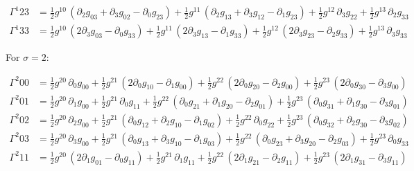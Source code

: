 \documentclass[
]{article}
\begin{document}
\[\begin{aligned}
\Gamma^{1}_{}{23} &= \tfrac{1}{2} g^{10}\, \left( \partial_{2} g_{03} + \partial_{3} g_{02} - \partial_{0} g_{23} \right) + \tfrac{1}{2} g^{11}\, \left( \partial_{2} g_{13} + \partial_{3} g_{12} - \partial_{1} g_{23} \right) + \tfrac{1}{2} g^{12}\, \partial_{3} g_{22} + \tfrac{1}{2} g^{13}\, \partial_{2} g_{33} \\
\Gamma^{1}_{}{33} &= \tfrac{1}{2} g^{10}\, \left( 2 \partial_{3} g_{03} - \partial_{0} g_{33} \right) + \tfrac{1}{2} g^{11}\, \left( 2 \partial_{3} g_{13} - \partial_{1} g_{33} \right) + \tfrac{1}{2} g^{12}\, \left( 2 \partial_{3} g_{23} - \partial_{2} g_{33} \right) + \tfrac{1}{2} g^{13}\, \partial_{3} g_{33}
\end{aligned}\]

For \(\sigma = 2\):

\[\begin{aligned}
\Gamma^{2}_{}{00} &= \tfrac{1}{2} g^{20}\, \partial_{0} g_{00} + \tfrac{1}{2} g^{21}\, \left( 2 \partial_{0} g_{10} - \partial_{1} g_{00} \right) + \tfrac{1}{2} g^{22}\, \left( 2 \partial_{0} g_{20} - \partial_{2} g_{00} \right) + \tfrac{1}{2} g^{23}\, \left( 2 \partial_{0} g_{30} - \partial_{3} g_{00} \right) \\
\Gamma^{2}_{}{01} &= \tfrac{1}{2} g^{20}\, \partial_{1} g_{00} + \tfrac{1}{2} g^{21}\, \partial_{0} g_{11} + \tfrac{1}{2} g^{22}\, \left( \partial_{0} g_{21} + \partial_{1} g_{20} - \partial_{2} g_{01} \right) + \tfrac{1}{2} g^{23}\, \left( \partial_{0} g_{31} + \partial_{1} g_{30} - \partial_{3} g_{01} \right) \\
\Gamma^{2}_{}{02} &= \tfrac{1}{2} g^{20}\, \partial_{2} g_{00} + \tfrac{1}{2} g^{21}\, \left( \partial_{0} g_{12} + \partial_{2} g_{10} - \partial_{1} g_{02} \right) + \tfrac{1}{2} g^{22}\, \partial_{0} g_{22} + \tfrac{1}{2} g^{23}\, \left( \partial_{0} g_{32} + \partial_{2} g_{30} - \partial_{3} g_{02} \right) \\
\Gamma^{2}_{}{03} &= \tfrac{1}{2} g^{20}\, \partial_{3} g_{00} + \tfrac{1}{2} g^{21}\, \left( \partial_{0} g_{13} + \partial_{3} g_{10} - \partial_{1} g_{03} \right) + \tfrac{1}{2} g^{22}\, \left( \partial_{0} g_{23} + \partial_{3} g_{20} - \partial_{2} g_{03} \right) + \tfrac{1}{2} g^{23}\, \partial_{0} g_{33} \\
\Gamma^{2}_{}{11} &= \tfrac{1}{2} g^{20}\, \left( 2 \partial_{1} g_{01} - \partial_{0} g_{11} \right) + \tfrac{1}{2} g^{21}\, \partial_{1} g_{11} + \tfrac{1}{2} g^{22}\, \left( 2 \partial_{1} g_{21} - \partial_{2} g_{11} \right) + \tfrac{1}{2} g^{23}\, \left( 2 \partial_{1} g_{31} - \partial_{3} g_{11} \right) \\

\end{aligned}\]
\end{document}
